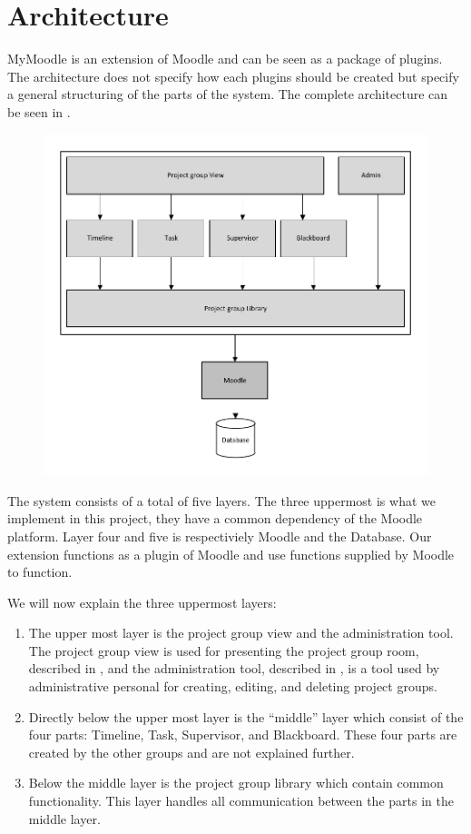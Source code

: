 \section{Architecture}
MyMoodle is an extension of Moodle and can be seen as a package of plugins. 
The architecture does not specify how each plugins should be created but specify a general structuring of the parts of the system. 
The complete architecture can be seen in .
\begin{figure}
	\centering
		\includegraphics{images/architecture.pdf}
	\label{fig:architecture}
\end{figure}

The system consists of a total of five layers. 
The three uppermost is what we implement in this project, they have a common dependency of the Moodle platform. Layer four and five is respectiviely Moodle and the Database.
Our extension functions as a plugin of Moodle and use functions supplied by Moodle to function.

We will now explain the three uppermost layers:
\begin{enumerate}
	\item The upper most layer is the project group view and the administration tool. The project group view is used for presenting the project group room, described in , and the administration tool, described in , is a tool used by administrative personal for creating, editing, and deleting project groups.
	\item Directly below the upper most layer is the ``middle'' layer which consist of the four parts: Timeline, Task, Supervisor, and Blackboard. These four parts are created by the other groups and are not explained further.
	\item Below the middle layer is the project group library which contain common functionality. This layer handles all communication between the parts in the middle layer.  
\end{enumerate}


